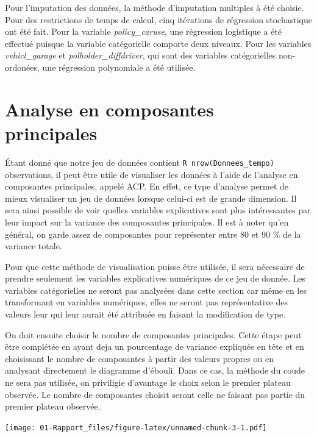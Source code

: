 \documentclass[
]{article}
\begin{document}
Pour l'imputation des données, la méthode d'imputation multiples à été
choisie. Pour des restrictions de temps de calcul, cinq itérations de
régression stochastique ont été fait. Pour la variable
\emph{policy\_caruse}, une régression logistique a été effectué puisque
la variable catégorielle comporte deux niveaux. Pour les variables
\emph{vehicl\_garage} et \emph{polholder\_diffdriver}, qui sont des
variables catégorielles non-ordonées, une régression polynomiale a été
utilisée.

\newpage

\hypertarget{analyse-en-composantes-principales}{%
\section{Analyse en composantes
principales}\label{analyse-en-composantes-principales}}

Étant donné que notre jeu de données contient
\texttt{R\ nrow(Donnees\_tempo)} observations, il peut être utile de
visualiser les données à l'aide de l'analyse en composantes principales,
appelé ACP. En effet, ce type d'analyse permet de mieux visualiser un
jeu de données lorsque celui-ci est de grande dimension. Il sera ainsi
possible de voir quelles variables explicatives sont plus intéressantes
par leur impact sur la variance des composantes principales. Il est à
noter qu'en général, on garde assez de composantes pour représenter
entre 80 et 90 \% de la variance totale.

Pour que cette méthode de visualisation puisse être utilisée, il sera
nécessaire de prendre seulement les variables explicatives numériques de
ce jeu de donnée. Les variables catégorielles ne seront pas analysées
dans cette section car même en les transformant en variables numériques,
elles ne seront pas représentative des valeurs leur qui leur aurait été
attribuée en faisant la modification de type.

On doit ensuite choisir le nombre de composantes principales. Cette
étape peut être complétée en ayant deja un pourcentage de variance
expliquée en tête et en choisissant le nombre de composantes à partir
des valeurs propres ou en analysant directement le diagramme d'ébouli.
Dans ce cas, la méthode du coude ne sera pas utilisée, on priviligie
d'avantage le choix selon le premier plateau observée. Le nombre de
composantes choisit seront celle ne faisant pas partie du premier
plateau observée.

\texttt{[image: 01-Rapport\_files/figure-latex/unnamed-chunk-3-1.pdf]}
\end{document}
